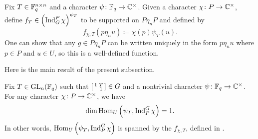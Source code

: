 \begin{example} \label{ex:produce-psi-t-eigen}
	Fix $T\in \mathbb F_q^{n\times n}$ and a character $\psi\colon\mathbb F_q\to\mathbb C^\times$. Given a character $\chi\colon P\to\mathbb C^\times$, define $f_T\in\left(\operatorname{Ind}_G^P\chi\right)^{\psi_T}$ to be supported on $P\eta_nP$ and defined by
	\[f_{\chi,T}(p\eta_nu)\coloneqq\chi(p)\psi_T(u).\]
	One can show that any $g\in P\eta_nP$ can be written uniquely in the form $p\eta_nu$ where $p\in P$ and $u\in U$, so this is a well-defined function.
\end{example}
Here is the main result of the present subsection.
\begin{proposition} \label{prop:psi-t-mult-one}
	Fix $T\in\mathrm{GL}_n(\mathbb F_q)$ such that $\begin{bsmallmatrix}
		1 & T \\ & 1
	\end{bsmallmatrix}\in G$ and a nontrivial character $\psi\colon\mathbb F_q\to\mathbb C^\times$. For any character $\chi\colon P\to\mathbb C^\times$, we have
	\[\dim\operatorname{Hom}_U\left(\psi_T,\operatorname{Ind}_P^G\chi\right)=1.\]
	In other words, $\operatorname{Hom}_U\left(\psi_T,\operatorname{Ind}_P^G\chi\right)$ is spanned by the $f_{\chi,T}$, defined in .
\end{proposition}
